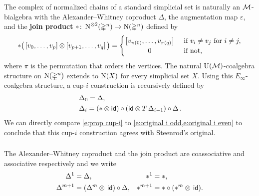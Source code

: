 The complex of normalized chains of a standard simplicial set is naturally an $\mathcal{M}$-bialgebra with the Alexander--Whitney coproduct $\Delta$, the augmentation map $\varepsilon$, and the \textbf{join product} $\ast \colon \operatorname{N}^{\otimes 2}(\mathbb{\Delta}^n) \to \operatorname{N}(\mathbb{\Delta}^n)$ defined by
\[
\ast \big(\left[v_0, \dots, v_p \right] \ot \left[v_{p+1}, \dots, v_q\right]\big) =
\begin{cases} \left[v_{\pi(0)}, \dots, v_{\pi(q)}\right] & \text{ if } v_i \neq v_j \text{ for } i \neq j, \\
\hfil 0 & \text{ if not}, \end{cases}
\]
where $\pi$ is the permutation that orders the vertices.
The natural ${\operatorname{U}(\mathcal{M})}$-coalgebra structure on $\operatorname{N}(\mathbb{\Delta}^n)$ extends to $\operatorname{N}(X)$ for every simplicial set $X$.
Using this $E_\infty$-coalgebra structure, a \mbox{cup-$i$} construction is recursively defined by
\begin{equation} \label{e:prop cup-i}
\begin{split}
& \operatorname{\Delta}_0 = \operatorname{\Delta}, \\
& \operatorname{\Delta}_i =
(\ast \otimes \mathsf{id}) \circ (\mathsf{id} \otimes T \operatorname{\Delta}_{i-1}) \circ \operatorname{\Delta}.
\end{split}
\end{equation}
We can directly compare \cref{e:prop cup-i} to \cref{e:original i odd,e:original i even} to conclude that this \mbox{cup-$i$} construction agrees with Steenrod's original.

\subsubsection{}

The Alexander--Whitney coproduct and the join product are coassociative and associative respectively and we write
\begin{align*}
\Delta^1 &= \Delta, &
\ast^1 &= \ast, \\
\Delta^{m+1} &= (\Delta^m \otimes \, \mathsf{id}) \circ \Delta, &
\ast^{m+1} &= \ast \circ (\ast^m \otimes \, \mathsf{id}).
\end{align*}

